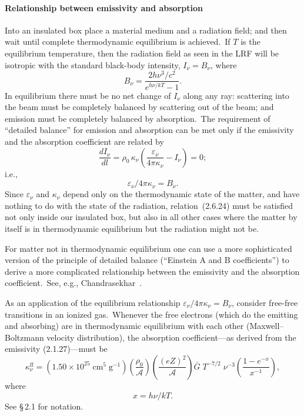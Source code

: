 \paragraph*{Relationship between emissivity and absorption}

Into an insulated box place a material medium and a radiation field; and then wait
until complete thermodynamic equilibrium is achieved.\ If $T$ is the equilibrium
temperature, then the radiation field as seen in the LRF will be isotropic with the
standard black-body intensity, $I_\nu = B_\nu$, where
%
\begin{equation}
B_\nu = \frac{2h\nu^3/c^2}{e^{h\nu/kT} - 1}.
\tag{2.6.23}
\end{equation}
%
In equilibrium there must be no net change of $I_\nu$ along any ray: scattering into
the beam must be completely balanced by scattering out of the beam; and
emission must be completely balanced by absorption.\ The requirement of
``detailed balance'' for emission and absorption can be met only if the emissivity
and the absorption coefficient are related by
%
\begin{equation}
\frac{dI_\nu}{dl} = \rho_0\,\kappa_\nu
  \!\left(\frac{\varepsilon_\nu}{4\pi\kappa_\nu}
  - I_\nu\right) = 0;
\tag{2.6.24}
\end{equation}
%
i.e.,
%
\[
\varepsilon_\nu / 4\pi\kappa_\nu = B_\nu.
\]
%
Since $\varepsilon_\nu$ and $\kappa_\nu$ depend only on the thermodynamic state of the matter, and
have nothing to do with the state of the radiation, relation~(2.6.24) must be
satisfied not only inside our insulated box, but also in all other cases where
the matter by itself is in thermodynamic equilibrium but the radiation might
not be.

For matter not in thermodynamic equilibrium one can use a more sophisticated
version of the principle of detailed balance (``Einstein A and B coefficients'') to
derive a more complicated relationship between the emissivity and the absorption
coefficient.\ See, e.g., Chandrasekhar~\cite{Chandrasekhar1960}.

As an application of the equilibrium relationship $\varepsilon_\nu/4\pi\kappa_\nu = B_\nu$, consider free-free
transitions in an ionized gas.\ Whenever the free electrons (which do the
emitting and absorbing) are in thermodynamic equilibrium with each other
(Maxwell--Boltzmann velocity distribution), the absorption coefficient---as
derived from the emissivity (2.1.27)---must be
%
\begin{equation}
\kappa_\nu^{\mathrm{ff}} = (1.50 \times 10^{25}\;\mathrm{cm}^5\;\mathrm{g}^{-1})
  \left(\frac{\rho_0}{\mathcal{A}}\right)
  \left(\frac{(eZ)^2}{\mathcal{A}}\right)
  \bar{G}\;T^{-7/2}\;\nu^{-3}
  \left(\frac{1 - e^{-x}}{x^{-1}}\right),
\tag{2.6.25}
\end{equation}
%
where
\[
x = h\nu/kT.
\]
%
See \S\,2.1 for notation.
